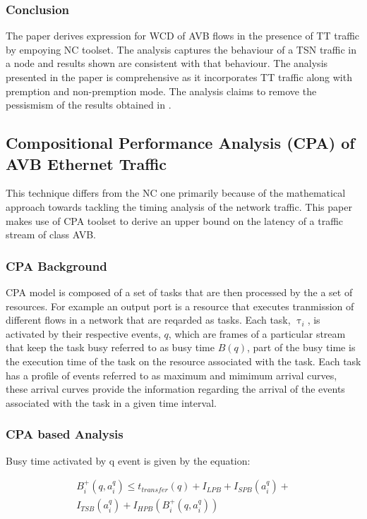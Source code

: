 \documentclass[journal,12pt,twocolumn]{IEEEtran}
\begin{document}
\subsubsection{Conclusion}
The paper derives expression for WCD of AVB flows in the presence of TT traffic by empoying NC toolset. The analysis captures the behaviour of a TSN traffic in a node and results shown are consistent with that behaviour. The analysis presented in the paper is comprehensive as it incorporates TT traffic along with premption and non-premption mode. The analysis claims to remove the pessismism of the results obtained in \cite{NCCOMPARE}. 

\subsection {Compositional Performance Analysis (CPA) of AVB Ethernet Traffic}
This technique \cite{CPA} differs from the NC one primarily because of the mathematical approach towards tackling the timing analysis of the network traffic. This paper makes use of CPA toolset to derive an upper bound on the latency of a traffic stream of class AVB.
\subsubsection{CPA Background}
CPA model is composed of a set of tasks that are then processed by the a set of resources. For example an output port is a resource that executes tranmission of different flows in a network that are reqarded as tasks. Each task, $\uptau_i$,  is activated by their respective events, $q$, which are frames of a particular stream that keep the task busy referred to as busy time $B(q)$, part of the busy time is the execution time of the task on the resource associated with the task. Each task has a profile of events referred to as maximum and mimimum arrival curves, these arrival curves provide the information regarding the arrival of the events associated with the task in a given time interval.
\subsubsection{CPA based Analysis}
Busy time activated by q event is given by the equation:

\begin{align*}
\label{Busytime}
B_i^+(q,a_i^q)\leq t_{transfer}(q)+I_{LPB}+I_{SPB}(a_i^q)+\\
			I_{TSB}(a_i^q)+I_{HPB}(B_i^+(q,a_i^q))
\end{align*}
\end{document}
